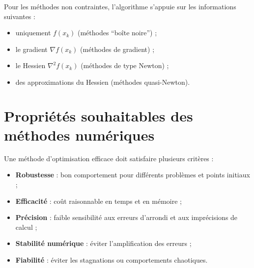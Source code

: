 \begin{center}
\end{center}

Pour les méthodes non contraintes, l'algorithme s'appuie sur les informations suivantes :

\begin{itemize}
  \item uniquement $f(x_k)$ (méthodes ``boîte noire'') ;
  \item le gradient $\nabla f(x_k)$ (méthodes de gradient) ;
  \item le Hessien $\nabla^2 f(x_k)$ (méthodes de type Newton) ;
  \item des approximations du Hessien (méthodes quasi-Newton).
\end{itemize}

\section{Propriétés souhaitables des méthodes numériques}

Une méthode d’optimisation efficace doit satisfaire plusieurs critères :

\begin{itemize}
  \item \textbf{Robustesse} : bon comportement pour différents problèmes et points initiaux ;
  \item \textbf{Efficacité} : coût raisonnable en temps et en mémoire ;
  \item \textbf{Précision} : faible sensibilité aux erreurs d’arrondi et aux imprécisions de calcul ;
  \item \textbf{Stabilité numérique} : éviter l’amplification des erreurs ;
  \item \textbf{Fiabilité} : éviter les stagnations ou comportements chaotiques.
\end{itemize}

